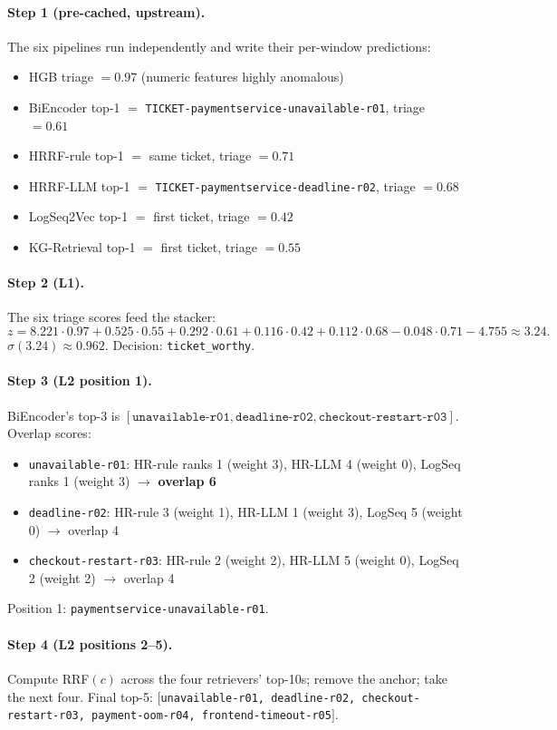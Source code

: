 \paragraph{Step 1 (pre-cached, upstream).} The six pipelines run independently and write their per-window predictions:
\begin{itemize}
\item HGB triage $= 0.97$ (numeric features highly anomalous)
\item BiEncoder top-1 $= $ \texttt{TICKET-paymentservice-unavailable-r01}, triage $= 0.61$
\item HRRF-rule top-1 $= $ same ticket, triage $= 0.71$
\item HRRF-LLM top-1 $= $ \texttt{TICKET-paymentservice-deadline-r02}, triage $= 0.68$
\item LogSeq2Vec top-1 $= $ first ticket, triage $= 0.42$
\item KG-Retrieval top-1 $= $ first ticket, triage $= 0.55$
\end{itemize}

\paragraph{Step 2 (L1).} The six triage scores feed the stacker:
\[
z = 8.221 \cdot 0.97 + 0.525 \cdot 0.55 + 0.292 \cdot 0.61 + 0.116 \cdot 0.42 + 0.112 \cdot 0.68 - 0.048 \cdot 0.71 - 4.755 \approx 3.24.
\]
$\sigma(3.24) \approx 0.962$. Decision: \texttt{ticket\_worthy}.

\paragraph{Step 3 (L2 position 1).} BiEncoder's top-3 is $[\texttt{unavailable-r01}, \texttt{deadline-r02}, \texttt{checkout-restart-r03}]$. Overlap scores:
\begin{itemize}
\item \texttt{unavailable-r01}: HR-rule ranks 1 (weight 3), HR-LLM 4 (weight 0), LogSeq ranks 1 (weight 3) $\rightarrow$ \textbf{overlap 6}
\item \texttt{deadline-r02}: HR-rule 3 (weight 1), HR-LLM 1 (weight 3), LogSeq 5 (weight 0) $\rightarrow$ overlap 4
\item \texttt{checkout-restart-r03}: HR-rule 2 (weight 2), HR-LLM 5 (weight 0), LogSeq 2 (weight 2) $\rightarrow$ overlap 4
\end{itemize}
Position 1: \texttt{paymentservice-unavailable-r01}.

\paragraph{Step 4 (L2 positions 2--5).} Compute RRF$(c)$ across the four retrievers' top-10s; remove the anchor; take the next four. Final top-5: $[$\texttt{unavailable-r01, deadline-r02, checkout-restart-r03, payment-oom-r04, frontend-timeout-r05}$]$.

